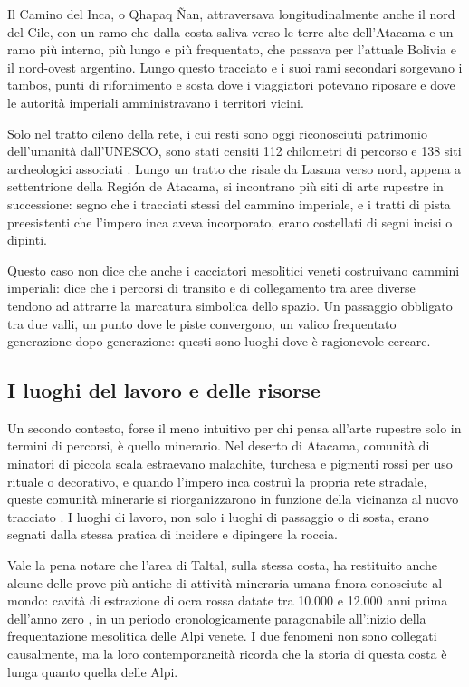 Il Camino del Inca, o Qhapaq Ñan, attraversava longitudinalmente anche il nord del Cile, con un ramo che dalla costa saliva verso le terre alte dell'Atacama e un ramo più interno, più lungo e più frequentato, che passava per l'attuale Bolivia e il nord-ovest argentino. Lungo questo tracciato e i suoi rami secondari sorgevano i tambos, punti di rifornimento e sosta dove i viaggiatori potevano riposare e dove le autorità imperiali amministravano i territori vicini.

Solo nel tratto cileno della rete, i cui resti sono oggi riconosciuti patrimonio dell'umanità dall'UNESCO, sono stati censiti 112 chilometri di percorso e 138 siti archeologici associati \citep{mnhn_qhapaq_atacama}. Lungo un tratto che risale da Lasana verso nord, appena a settentrione della Región de Atacama, si incontrano più siti di arte rupestre in successione: segno che i tracciati stessi del cammino imperiale, e i tratti di pista preesistenti che l'impero inca aveva incorporato, erano costellati di segni incisi o dipinti.

Questo caso non dice che anche i cacciatori mesolitici veneti costruivano cammini imperiali: dice che i percorsi di transito e di collegamento tra aree diverse tendono ad attrarre la marcatura simbolica dello spazio. Un passaggio obbligato tra due valli, un punto dove le piste convergono, un valico frequentato generazione dopo generazione: questi sono luoghi dove è ragionevole cercare.

\subsection{I luoghi del lavoro e delle risorse}

Un secondo contesto, forse il meno intuitivo per chi pensa all'arte rupestre solo in termini di percorsi, è quello minerario. Nel deserto di Atacama, comunità di minatori di piccola scala estraevano malachite, turchesa e pigmenti rossi per uso rituale o decorativo, e quando l'impero inca costruì la propria rete stradale, queste comunità minerarie si riorganizzarono in funzione della vicinanza al nuovo tracciato \citep{qhapaq_atacama_minas}. I luoghi di lavoro, non solo i luoghi di passaggio o di sosta, erano segnati dalla stessa pratica di incidere e dipingere la roccia.

Vale la pena notare che l'area di Taltal, sulla stessa costa, ha restituito anche alcune delle prove più antiche di attività mineraria umana finora conosciute al mondo: cavità di estrazione di ocra rossa datate tra 10.000 e 12.000 anni prima dell'anno zero \citep{taltal_minas_antiguas}, in un periodo cronologicamente paragonabile all'inizio della frequentazione mesolitica delle Alpi venete. I due fenomeni non sono collegati causalmente, ma la loro contemporaneità ricorda che la storia di questa costa è lunga quanto quella delle Alpi.

